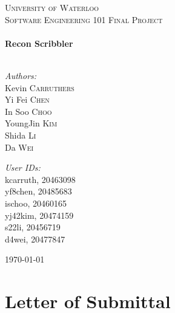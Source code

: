 \documentclass[12pt]{article}
\begin{document}
\begin{titlepage}
\begin{center}
\textsc{\LARGE University of Waterloo}\\[1.5cm]
\textsc{\Large Software Engineering 101 Final Project}\\[0.5cm]

\HRule \\[0.4cm]
{\huge \bfseries Recon Scribbler}\\
\HRule \\[1.5cm]

\begin{minipage}{0.4\textwidth}
\begin{flushleft} \large
\emph{Authors:}\\
Kevin \textsc{Carruthers}\\
Yi Fei \textsc{Chen}\\
In Soo \textsc{Choo}\\
YoungJin \textsc{Kim}\\
Shida \textsc{Li}\\
Da \textsc{Wei}
\end{flushleft}
\end{minipage}
\begin{minipage}{0.4\textwidth}
\begin{flushright} \large
\emph{User IDs:} \\
kcarruth, \textsc{20463098}\\
yf8chen, \textsc{20485683}\\
ischoo, \textsc{20460165}\\
yj42kim, \textsc{20474159}\\
s22li, \textsc{20456719}\\
d4wei, \textsc{20477847}
\end{flushright}
\end{minipage}

\vfill
{\large \today}
\end{center}
\end{titlepage}

\section*{\fontsize{16}{16}\textsf{Letter of Submittal}}
\onehalfspacing
\thispagestyle{empty}


\newpage

\tableofcontents\newpage
\listoffigures
{}
\newpage
\listoftables
{}
\newpage
{}
\end{document}

